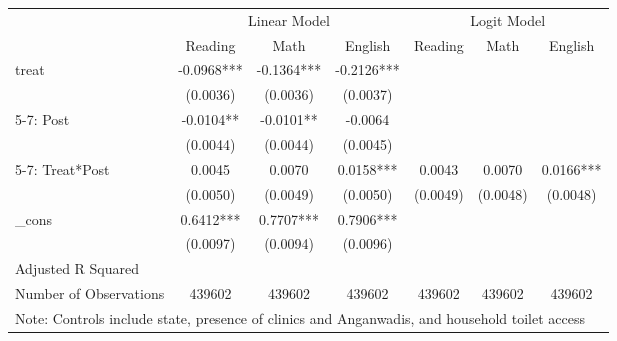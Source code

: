 {
\def\sym#1{\ifmmode^{#1}\else\(^{#1}\)\fi}
\begin{tabular}{l*{6}{c}}
\hline\hline
          &\multicolumn{3}{c}{Linear Model}&\multicolumn{3}{c}{Logit Model}\\\cmidrule(lr){2-4}\cmidrule(lr){5-7}
          &\multicolumn{1}{c}{Reading}&\multicolumn{1}{c}{Math}&\multicolumn{1}{c}{English}&\multicolumn{1}{c}{Reading}&\multicolumn{1}{c}{Math}&\multicolumn{1}{c}{English}\\
\hline
treat     &-0.0968***&-0.1364***&-0.2126***&    &    &    \\
          &(0.0036)   &(0.0036)   &(0.0037)   &    &    &    \\
[1em]
5-7: Post &-0.0104** &-0.0101** &-0.0064   &    &    &    \\
          &(0.0044)   &(0.0044)   &(0.0045)   &    &    &    \\
[1em]
5-7: Treat*Post&0.0045   &0.0070   &0.0158***&0.0043   &0.0070   &0.0166***\\
          &(0.0050)   &(0.0049)   &(0.0050)   &(0.0049)   &(0.0048)   &(0.0048)   \\
[1em]
\_cons    &0.6412***&0.7707***&0.7906***&    &    &    \\
          &(0.0097)   &(0.0094)   &(0.0096)   &    &    &    \\
\hline
Adjusted R Squared&    &    &    &    &    &    \\
Number of Observations&439602   &439602   &439602   &439602   &439602   &439602   \\
\hline\hline
\multicolumn{7}{l}{\footnotesize Note: Controls include state, presence of clinics and Anganwadis, and household toilet access}\\
\end{tabular}
}
